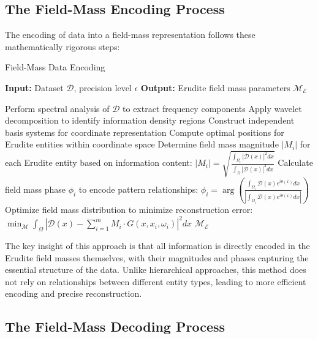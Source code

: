 \subsection{The Field-Mass Encoding Process}

The encoding of data into a field-mass representation follows these mathematically rigorous steps:

\begin{algorithm}[h]
\caption{Field-Mass Data Encoding}
\begin{algorithmic}[1]
\State \textbf{Input:} Dataset $\mathcal{D}$, precision level $\epsilon$
\State \textbf{Output:} Erudite field mass parameters $\mathcal{M}_{\mathcal{E}}$

\State Perform spectral analysis of $\mathcal{D}$ to extract frequency components
\State Apply wavelet decomposition to identify information density regions
\State Construct independent basis systems for coordinate representation
\State Compute optimal positions for Erudite entities within coordinate space
\State Determine field mass magnitude $|M_i|$ for each Erudite entity based on information content:
\State \hspace{1em} $|M_i| = \sqrt{\frac{\int_{\Omega_i} |\mathcal{D}(x)|^2 dx}{\int_\Omega |\mathcal{D}(x)|^2 dx}}$
\State Calculate field mass phase $\phi_i$ to encode pattern relationships:
\State \hspace{1em} $\phi_i = \arg\left(\frac{\int_{\Omega_i} \mathcal{D}(x) e^{i\theta(x)} dx}{|\int_{\Omega_i} \mathcal{D}(x) e^{i\theta(x)} dx|}\right)$
\State Optimize field mass distribution to minimize reconstruction error:
\State \hspace{1em} $\min_{\mathcal{M}} \int_\Omega \left| \mathcal{D}(x) - \sum_{i=1}^m M_i \cdot G(x, x_i, \omega_i) \right|^2 dx$
\State \Return $\mathcal{M}_{\mathcal{E}}$
\end{algorithmic}
\end{algorithm}

The key insight of this approach is that all information is directly encoded in the Erudite field masses themselves, with their magnitudes and phases capturing the essential structure of the data. Unlike hierarchical approaches, this method does not rely on relationships between different entity types, leading to more efficient encoding and precise reconstruction.

\subsection{The Field-Mass Decoding Process}

